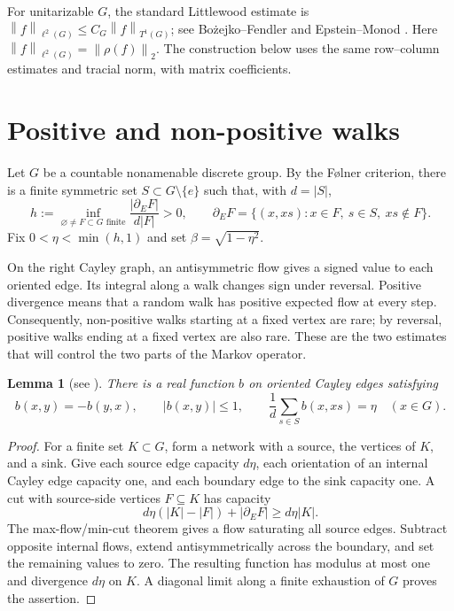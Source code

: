 \documentclass[a4paper,11pt]{amsproc}
\numberwithin{equation}{section}
\newtheorem{lemma}[theorem]{Lemma}
\theoremstyle{definition}
\newcommand{\norm}[1]{\left\lVert#1\right\rVert}
\begin{document}
For unitarizable $G$, the standard Littlewood estimate is
$\norm{f}_{\ell^2(G)}\le C_G\norm{f}_{T^1(G)}$; see Bo\.{z}ejko--Fendler \cite{bf} and Epstein--Monod \cite[Proposition 2.4]{em}. Here $\norm{f}_{\ell^2(G)}=\norm{\rho(f)}_2$. The construction below uses the same row--column estimates and tracial norm, with matrix coefficients.

\section{Positive and non-positive walks}
Let $G$ be a countable nonamenable discrete group. By the F\o lner criterion, there is a finite symmetric set $S\subset G\setminus\{e\}$ such that, with $d=|S|$,
\begin{equation}\label{eq:cheeger}
 h:=\inf_{\varnothing\ne F\subset G\text{ finite}}
 \frac{|\partial_E F|}{d|F|}>0,
 \qquad
 \partial_EF=\{(x,xs):x\in F,\ s\in S,\ xs\notin F\}.
\end{equation}
Fix $0<\eta<\min(h,1)$ and set $\beta=\sqrt{1-\eta^2}$.

On the right Cayley graph, an antisymmetric flow gives a signed value to each oriented edge. Its integral along a walk changes sign under reversal. Positive divergence means that a random walk has positive expected flow at every step. Consequently, non-positive walks starting at a fixed vertex are rare; by reversal, positive walks ending at a fixed vertex are also rare. These are the two estimates that will control the two parts of the Markov operator.

\begin{lemma}[see {\cite[Proposition 2.1]{blps}}]\label{lem:flow}
There is a real function $b$ on oriented Cayley edges satisfying
\begin{equation}\label{eq:flow}
 b(x,y)=-b(y,x),\qquad |b(x,y)|\le1,\qquad
 \frac1d\sum_{s\in S}b(x,xs)=\eta\quad(x\in G).
\end{equation}
\end{lemma}
\begin{proof}
For a finite set $K\subset G$, form a network with a source, the vertices of $K$, and a sink. Give each source edge capacity $d\eta$, each orientation of an internal Cayley edge capacity one, and each boundary edge to the sink capacity one. A cut with source-side vertices $F\subseteq K$ has capacity
\[
 d\eta(|K|-|F|)+|\partial_E F|\ge d\eta|K|.
\]
The max-flow/min-cut theorem gives a flow saturating all source edges. Subtract opposite internal flows, extend antisymmetrically across the boundary, and set the remaining values to zero. The resulting function has modulus at most one and divergence $d\eta$ on $K$. A diagonal limit along a finite exhaustion of $G$ proves the assertion.
\end{proof}
\end{document}
